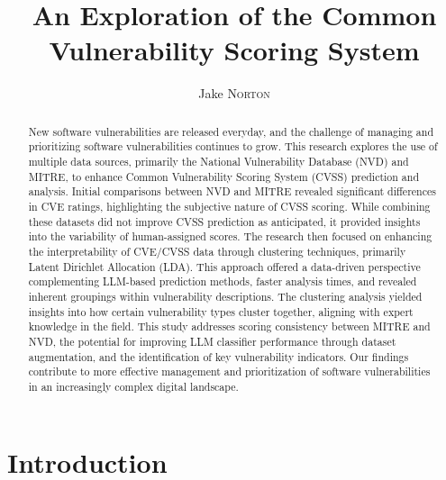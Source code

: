 \documentclass[12pt]{article}
\title{An Exploration of the Common Vulnerability Scoring System}
\author{Jake \textsc{Norton}}
\begin{document}
\maketitle

\begin{abstract}

	New software vulnerabilities are released everyday, and the challenge of managing and prioritizing
	software vulnerabilities continues to grow. This research explores the use of multiple data sources,
	primarily the National Vulnerability Database (NVD) and MITRE, to enhance Common Vulnerability
	Scoring System (CVSS) prediction and analysis. Initial comparisons between NVD and MITRE revealed
	significant differences in CVE ratings, highlighting the subjective nature of CVSS scoring. While
	combining these datasets did not improve CVSS prediction as anticipated, it provided insights into
	the variability of human-assigned scores. The research then focused on enhancing the
	interpretability of CVE/CVSS data through clustering techniques, primarily Latent Dirichlet
	Allocation (LDA). This approach offered a data-driven perspective complementing LLM-based prediction
	methods, faster analysis times, and revealed inherent groupings within vulnerability descriptions.
	The clustering analysis yielded insights into how certain vulnerability types cluster together,
	aligning with expert knowledge in the field. This study addresses scoring consistency between MITRE
	and NVD, the potential for improving LLM classifier performance through dataset augmentation, and
	the identification of key vulnerability indicators. Our findings contribute to more effective
	management and prioritization of software vulnerabilities in an increasingly complex digital
	landscape.

\end{abstract}


\section{Introduction}
\end{document}
